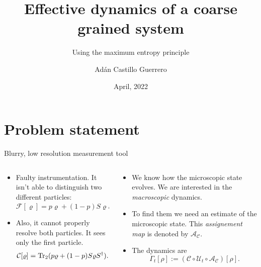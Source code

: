 \documentclass{cubeamer}
\title{Effective dynamics of a coarse grained system}
\subtitle{Using the maximum entropy principle}
\author[Adán Castillo Guerrero]{Adán Castillo Guerrero}
\date{April, 2022} %
\institute[National Autonomous University of Mexico]{National Autonomous University of Mexico}
\newcommand{\mcU}{\mathcal{U}}
\newcommand{\mcF}{\mathcal{F}}
\newcommand{\mcC}{\mathcal{C}}
\newcommand{\mcA}{\mathcal{A}}
\begin{document}
\maketitle

\cutoc
\section{Problem statement}
\begin{frame}{Blurry, low resolution measurement tool}
    \begin{columns}
        \begin{column}{0.5\textwidth}
            \begin{itemize}
                \item  Faulty instrumentation. It isn't able to distinguish two different particles:
                \begin{equation*}
                    \mcF[\varrho]=p\varrho+(1-p)S\varrho S^{\dag}.
                \end{equation*}
                \item Also, it cannot properly resolve both particles. It sees only the first particle.
                \begin{equation*}
                    \mcC[\varrho]=\Tr_{2}(p\varrho+(1-p)S\varrho S^{\dag}).
                \end{equation*}
            \end{itemize}
        \end{column}
        \begin{column}{0.5\textwidth}
            \begin{itemize}
                \item We know how the microscopic state evolves. We are interested in the \textit{macroscopic} dynamics.
                \item To find them we need an estimate of the microscopic state. This \textit{assignement map} is denoted by $\mcA_\mcC$. 
                \item The dynamics are
                \begin{equation*}
                    \Gamma_t[\rho]:=(\mcC \circ \mcU_t \circ \mcA_\mcC)[\rho].
                \end{equation*}
            \end{itemize}
        \end{column}
    \end{columns}
\end{frame}
\end{document}
